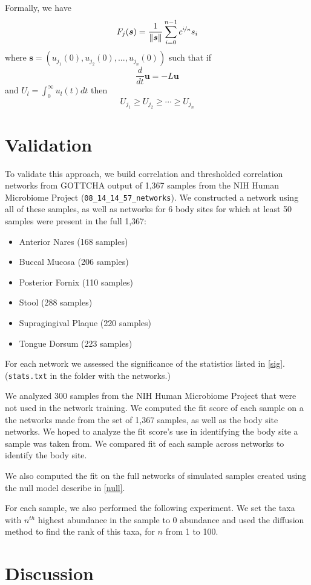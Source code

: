 \documentclass[10pt]{article}
\theoremstyle{definition}
\numberwithin{theorem}{section}
\numberwithin{definition}{section}
\numberwithin{lemma}{section}
\numberwithin{corollary}{section}
\numberwithin{clm}{section}
\numberwithin{rmk}{section}
\renewcommand{\b}{\bm}
\begin{document}
Formally, we have
\[
F_j(\b{s}) =\frac{1}{\|\b{s}\|} \sum_{i=0}^{n-1} c^{\nicefrac{i}{n}} s_i
\]
where $\b{s} = (u_{j_1}(0),u_{j_2}(0),...,u_{j_n}(0))$ such that if 
\[
\frac{d}{dt}\b{u} = -L\b{u}
\]
and $U_l = \int_0^{\infty} u_l(t) dt$ then
\[
U_{j_1} \geq U_{j_2} \geq \cdots \geq U_{j_n}
\]

\section{Validation}

To validate this approach, we build correlation and thresholded correlation networks from GOTTCHA output of 1,367 samples from the NIH Human Microbiome Project (\verb|08_14_14_57_networks|). We constructed a network using all of these samples, as well as networks for 6 body sites for which at least 50 samples were present in the full 1,367:
\begin{itemize}
	\item Anterior Nares (168 samples) 
	\item Buccal Mucosa (206 samples)
	\item Posterior Fornix (110 samples)
	\item Stool (288 samples)
	\item Supragingival Plaque (220 samples)
	\item Tongue Dorsum (223 samples)
\end{itemize}
For each network we assessed the significance of the statistics listed in \cref{sig}. (\verb|stats.txt| in the folder with the networks.)

We analyzed 300 samples from the NIH Human Microbiome Project that were not used in the network training. We computed the fit score of each sample on a the networks made from the set of 1,367 samples, as well as the body site networks. We hoped to analyze the fit score's use in identifying the body site a sample was taken from. We compared fit of each sample across networks to identify the body site. 

We also computed the fit on the full networks of simulated samples created using the null model describe in \cref{null}. 

For each sample, we also performed the following experiment. We set the taxa with $n^{th}$ highest abundance in the sample to $0$ abundance and used the diffusion method to find the rank of this taxa, for $n$ from 1 to 100.

\section{Discussion}



\end{document}
